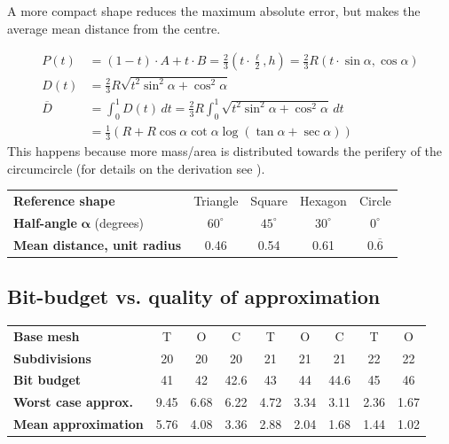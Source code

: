 \documentclass{article}
\begin{document}
A more compact shape reduces the maximum absolute error, but makes the average mean distance from the centre.

\begin{align*}
P(t) &= (1-t) \cdot A + t \cdot B = \frac{2}{3} \left( t \cdot \frac{\ell}{2}, h \right) = \frac{2}{3} R \left( t \cdot \sin \alpha, \cos \alpha \right) \\
D(t) &= \frac{2}{3} R \sqrt{ t^2 \sin^2 \alpha + \cos^2 \alpha } \\
\overline{D} &= \int_{0}^{1} D(t) \, dt = \frac{2}{3} R \int_{0}^{1} \sqrt{ t^2 \sin^2 \alpha + \cos^2 \alpha } \, dt \\
&= \frac{1}{3} (R + R \cos \alpha \cot \alpha  \log (\tan \alpha + \sec \alpha ))
\end{align*}
%
This happens because more mass/area is distributed towards the perifery of the circumcircle (for details on the derivation see \cite{meandistance}).
\\

\begin{tabular}{lcccc}
\textbf{Reference shape}            & Triangle & Square & Hexagon & Circle \\
\textbf{Half-angle} $\mathbf{\alpha}$ (degrees)       & $60^\circ$ & $45^\circ$ & $30^\circ$ & $0^\circ$ \\
\textbf{Mean distance, unit radius} & 0.46 & 0.54 & 0.61 & $0.\overline{6}$
\end{tabular}


\subsection{Bit-budget vs. quality of approximation}

\begin{tabular}{lcccccccc}
\textbf{Base mesh} & T & O & C & T & O & C & T & O \\
\textbf{Subdivisions} & 20 & 20 & 20 & 21 & 21 & 21 & 22 & 22 \\
\textbf{Bit budget} & 41 & 42 & 42.6 & 43 & 44 & 44.6 & 45 & 46 \\
\textbf{Worst case approx.} & 9.45 & 6.68 & 6.22 & 4.72 & 3.34 & 3.11 & 2.36 & 1.67 \\
\textbf{Mean approximation} & 5.76 & 4.08 & 3.36 & 2.88 & 2.04 & 1.68 & 1.44 & 1.02
\end{tabular}
\end{document}
